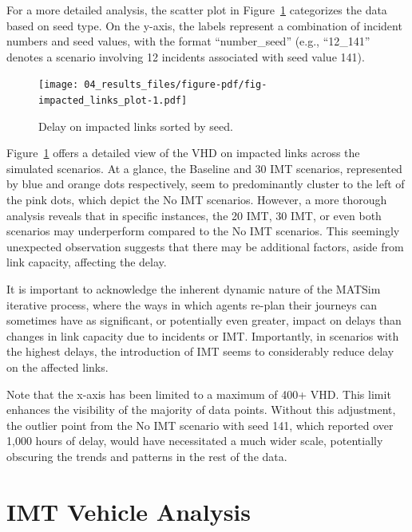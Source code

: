 \documentclass[fancy, oneside, mastersfancy, ms]{byuthesis}
\begin{document}
For a more detailed analysis, the scatter plot in
Figure~\ref{fig-impacted_links_plot} categorizes the data based on seed
type. On the y-axis, the labels represent a combination of incident
numbers and seed values, with the format ``number\_seed'' (e.g.,
``12\_141'' denotes a scenario involving 12 incidents associated with
seed value 141).

\begin{figure}

{\centering \texttt{[image: 04\_results\_files/figure-pdf/fig-impacted\_links\_plot-1.pdf]}

}

\caption{\label{fig-impacted_links_plot}Delay on impacted links sorted
by seed.}

\end{figure}

Figure~\ref{fig-impacted_links_plot} offers a detailed view of the VHD
on impacted links across the simulated scenarios. At a glance, the
Baseline and 30 IMT scenarios, represented by blue and orange dots
respectively, seem to predominantly cluster to the left of the pink
dots, which depict the No IMT scenarios. However, a more thorough
analysis reveals that in specific instances, the 20 IMT, 30 IMT, or even
both scenarios may underperform compared to the No IMT scenarios. This
seemingly unexpected observation suggests that there may be additional
factors, aside from link capacity, affecting the delay.

It is important to acknowledge the inherent dynamic nature of the MATSim
iterative process, where the ways in which agents re-plan their journeys
can sometimes have as significant, or potentially even greater, impact
on delays than changes in link capacity due to incidents or IMT.
Importantly, in scenarios with the highest delays, the introduction of
IMT seems to considerably reduce delay on the affected links.

Note that the x-axis has been limited to a maximum of 400+ VHD. This
limit enhances the visibility of the majority of data points. Without
this adjustment, the outlier point from the No IMT scenario with seed
141, which reported over 1,000 hours of delay, would have necessitated a
much wider scale, potentially obscuring the trends and patterns in the
rest of the data.

\hypertarget{imt-vehicle-analysis}{%
\section{IMT Vehicle Analysis}\label{imt-vehicle-analysis}}
\end{document}
